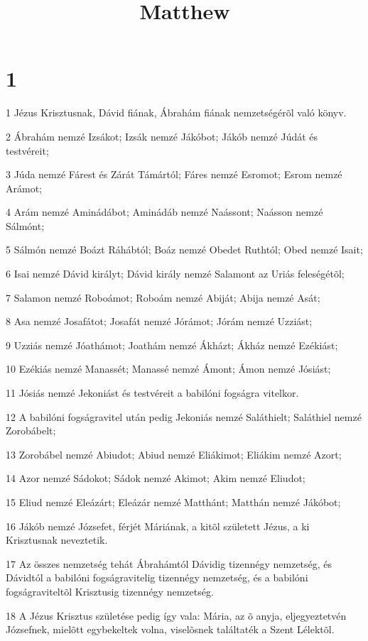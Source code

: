 

\title{Matthew}


\chapter{1}

\par 1 Jézus Krisztusnak, Dávid fiának, Ábrahám fiának nemzetségérõl való könyv.
\par 2 Ábrahám nemzé Izsákot; Izsák nemzé Jákóbot; Jákób nemzé Júdát és testvéreit;
\par 3 Júda nemzé Fárest és Zárát Támártól; Fáres nemzé Esromot; Esrom  nemzé Arámot;
\par 4 Arám nemzé Aminádábot; Aminádáb nemzé Naássont; Naásson nemzé Sálmónt;
\par 5 Sálmón nemzé Boázt Ráhábtól; Boáz nemzé Obedet Ruthtól; Obed nemzé Isait;
\par 6 Isai nemzé Dávid királyt; Dávid király nemzé Salamont az  Uriás feleségétõl;
\par 7 Salamon nemzé Roboámot; Roboám nemzé Abiját; Abija nemzé Asát;
\par 8 Asa nemzé Josafátot; Josafát nemzé Jórámot; Jórám nemzé Uzziást;
\par 9 Uzziás nemzé Jóathámot; Joathám nemzé Ákházt; Ákház  nemzé Ezékiást;
\par 10 Ezékiás nemzé Manassét; Manassé nemzé  Ámont; Ámon nemzé Jósiást;
\par 11 Jósiás nemzé Jekoniást és testvéreit a babilóni fogságra vitelkor.
\par 12 A babilóni fogságravitel után pedig Jekoniás nemzé Saláthielt; Saláthiel nemzé  Zorobábelt;
\par 13 Zorobábel nemzé Abiudot; Abiud nemzé Eliákimot; Eliákim nemzé Azort;
\par 14 Azor nemzé Sádokot; Sádok nemzé Akimot; Akim nemzé Eliudot;
\par 15 Eliud nemzé Eleázárt; Eleázár nemzé Matthánt; Matthán nemzé Jákóbot;
\par 16 Jákób nemzé Józsefet, férjét Máriának, a kitõl született Jézus, a ki Krisztusnak neveztetik.
\par 17 Az összes nemzetség tehát Ábrahámtól Dávidig tizennégy nemzetség, és Dávidtól a babilóni fogságravitelig tizennégy nemzetség, és a babilóni fogságraviteltõl Krisztusig tizennégy nemzetség.
\par 18 A Jézus Krisztus születése pedig így vala: Mária, az õ anyja, eljegyeztetvén Józsefnek, mielõtt egybekeltek volna, viselõsnek találtaték a Szent Lélektõl.
